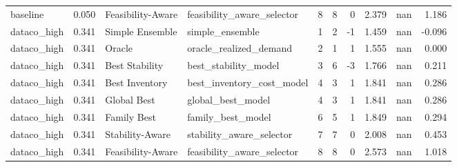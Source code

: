 \begin{table}
{\begin{tabular}{lrllrrrrrr}
      baseline &             0.050 &  Feasibility-Aware &  feasibility\_aware\_selector &                              8 &                                       8 &                        0 &                  2.379 &               nan &                  1.186 \\
   dataco\_high &             0.341 &    Simple Ensemble &             simple\_ensemble &                              1 &                                       2 &                       -1 &                  1.459 &               nan &                 -0.096 \\
   dataco\_high &             0.341 &             Oracle &      oracle\_realized\_demand &                              2 &                                       1 &                        1 &                  1.555 &               nan &                  0.000 \\
   dataco\_high &             0.341 &     Best Stability &        best\_stability\_model &                              3 &                                       6 &                       -3 &                  1.766 &               nan &                  0.211 \\
   dataco\_high &             0.341 &     Best Inventory &   best\_inventory\_cost\_model &                              4 &                                       3 &                        1 &                  1.841 &               nan &                  0.286 \\
   dataco\_high &             0.341 &        Global Best &           global\_best\_model &                              4 &                                       3 &                        1 &                  1.841 &               nan &                  0.286 \\
   dataco\_high &             0.341 &        Family Best &           family\_best\_model &                              6 &                                       5 &                        1 &                  1.849 &               nan &                  0.294 \\
   dataco\_high &             0.341 &    Stability-Aware &    stability\_aware\_selector &                              7 &                                       7 &                        0 &                  2.008 &               nan &                  0.453 \\
   dataco\_high &             0.341 &  Feasibility-Aware &  feasibility\_aware\_selector &                              8 &                                       8 &                        0 &                  2.573 &               nan &                  1.018 \\

\end{tabular}}
\end{table}
